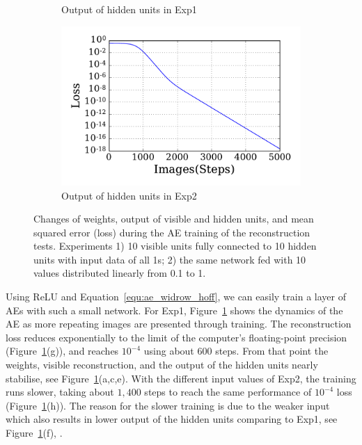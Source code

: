 \begin{figure}
\begin{subfigure}[t]{0.48\textwidth}
		\caption{Output of hidden units in Exp1}
	\end{subfigure}
	\begin{subfigure}[t]{0.48\textwidth}
		\includegraphics[width=\textwidth]{pics_sdlm/20_exp_AE/exp2_loss.pdf}
		\caption{Output of hidden units in Exp2}
	\end{subfigure}
	\caption[AE training of the reconstruction tests.]{Changes of weights, output of visible and hidden units, and mean squared error (loss) during the AE training of the reconstruction tests. 
		Experiments 1) 10 visible units fully connected to 10 hidden units with input data of all 1s; 2) the same network fed with 10 values distributed linearly from 0.1 to 1.}
	\label{fig:ae_orig}
\end{figure}
Using ReLU and Equation~\ref{equ:ae_widrow_hoff}, we can easily train a layer of AEs with such a small network.
For Exp1, Figure~\ref{fig:ae_orig} shows the dynamics of the AE as more repeating images are presented through training.
The reconstruction loss reduces exponentially to the limit of the computer's floating-point precision (Figure~\ref{fig:ae_orig}(g)), and reaches $10^{-4}$ using about 600 steps.
From that point the weights, visible reconstruction, and the output of the hidden units nearly stabilise, see Figure~\ref{fig:ae_orig}(a,c,e).
With the different input values of Exp2, the training runs slower, taking about $1,400$ steps to reach the same performance of $10^{-4}$ loss (Figure~\ref{fig:ae_orig}(h)).
The reason for the slower training is due to the weaker input which also results in lower output of the hidden units comparing to Exp1, see Figure~\ref{fig:ae_orig}(f), \DIFdelbegin {}\DIFdelend \DIFaddbegin {}\DIFaddend . 
